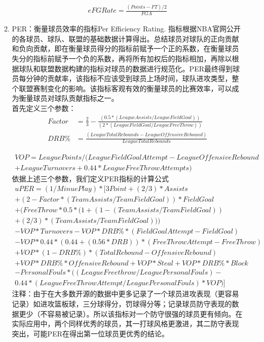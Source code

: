 \begin{enumerate}
\begin{enumerate}
		\begin{align}
		eFG Rate = \frac{(Points-FT)/2}{FGA}
		\end{align}
	
		\item PER：\cite{hollinger2005pro}衡量球员效率的指标Per Efficiency Rating. 指标根据NBA官网公开的各球员、球队、联盟的基础数据计算得出。总结球员对球队的正向贡献和负向贡献，即在衡量球员得分的指标前赋予一个正的系数，在衡量球员失分的指标前赋予一个负的系数，再将所有加权后的指标相加，再除以根据球队和联盟数据构建的指标对球员的数据进行规范化。PER最终得到球员每分钟的贡献率，该指标不应该受到球员上场时间，球队进攻类型，整个联盟赛制变化的影响。该指标客观有效的衡量球员的比赛效率，可以成为衡量球员对球队贡献指标之一。\\ 首先定义三个参数：
		\begin{align}
			Factor &= \frac{2}{3} - \frac{(0.5 * (League Assists / League Field Goal))}{(2 * (League Field Goal / League Free Throw))}\\
			DRB\%   &=  \frac{(League Total Rebounds - League Offensive Rebound)}{League Total Rebounds}
		\end{align}
		
		\begin{multline}
			VOP   =  League Points / (League Field Goal Attempt - League Offensive Rebound \\+ League Turnovers + 0.44 * League FreeThrowAttempts)
		\end{multline}
 依据上述三个参数，我们定义PER指标的计算公式
 \begin{multline}
 uPER = (1 / Minue Play) *
 [ 3Point
 + (2/3) * Assists
 \\+ (2 - Factor  * (Team Assists / Team Field Goal)) * Field Goal
 \\+ (Free Throw *0.5 * (1 + (1 - (Team Assists / Team Field Goal)) \\+ (2/3) * (Team Assists / Team Field Goal)))
 \\- VOP * Turnovers
 - VOP * DRB\%* (Field Goal Attempt - Field Goal)
 \\- VOP * 0.44 * (0.44 + (0.56 * DRB)) * (Free Throw Attempt - Free Throw)
 \\+ VOP * (1 - DRB\%) * (TotalRebound - Offensive Rebound)
 \\+ VOP * DRB\% * Offensive Rebound
 + VOP * Steal
 + VOP * DRB\% * Block
 \\- Personal Fouls * ((League Free throw / League Personal Fouls) - \\0.44 * (League FreeThrowAttempt / LeaguePersonalFouls) * VOP) ]
 \end{multline}
	注释：由于在大多数开源的数据中更多记录了一个球员进攻表现（更容易记录）如进攻篮板球，三分球得分，罚球得分等；记录球员防守表现的数据更少（不容易被记录）。所以该指标对一个防守很强的球员更有倾向。在实际应用中，两个同样优秀的球员，其一打球风格更激进，其二防守表现突出，可能PER在得出第一位球员更优秀的结论。	
	

\end{enumerate}
\end{enumerate}
